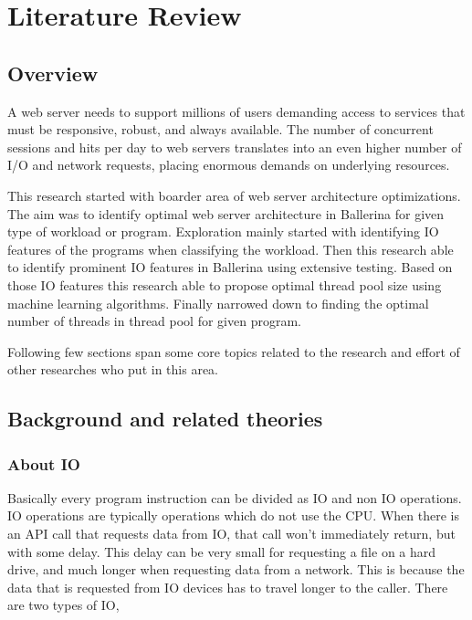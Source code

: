 \chapter{Literature Review}

\section{Overview}

A web server needs to support millions of users demanding access to services that must be responsive,
robust, and always available. The number of concurrent sessions and hits per day to web servers
translates into an even higher number of I/O and network requests, placing enormous demands on
underlying resources. 

This research started with boarder area of web server architecture optimizations. The aim was to identify optimal web server architecture in Ballerina for given type of workload or program. Exploration mainly started with identifying IO features of the programs when classifying the workload. Then this research able to identify prominent IO features in Ballerina using extensive testing. Based on those IO features this research able to propose optimal thread pool size using machine learning algorithms. Finally narrowed down to finding the optimal number of threads in thread pool for given program.

Following few sections span some core topics related to the research and effort of other researches who put in this area.



\section{Background and related theories}

\subsection{About IO}

Basically every program instruction can be divided as IO and non IO operations. IO operations are
typically operations which do not use the CPU. When there is an API call that requests data from IO,
that call won’t immediately return, but with some delay. \cite{nb_algo} This delay can be very small for
requesting a file on a hard drive, and much longer when requesting data from a network. This is
because the data that is requested from IO devices has to travel longer to the caller.
There are two types of IO,


